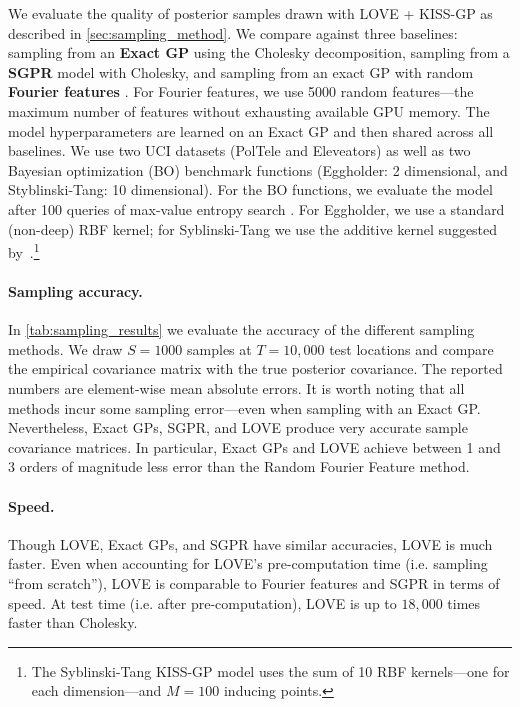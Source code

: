 We evaluate the quality of posterior samples drawn with LOVE + KISS-GP{} as described in \cref{sec:sampling_method}.
We compare against three baselines: sampling from an {\bf Exact GP} using the Cholesky decomposition, sampling from a {\bf SGPR} model with Cholesky, and sampling from an exact GP with random {\bf Fourier features} \citep{rahimi2008random}.
For Fourier features, we use 5000 random features---the maximum number of features without exhausting available GPU memory.
The model hyperparameters are learned on an Exact GP and then shared across all baselines.
We use two UCI datasets (PolTele and Eleveators) as well as two Bayesian optimization (BO) benchmark functions (Eggholder: 2 dimensional, and Styblinski-Tang: 10 dimensional).
For the BO functions, we evaluate the model after 100 queries of max-value entropy search \cite{wang2017max}.
For Eggholder, we use a standard (non-deep) RBF kernel;  for Syblinski-Tang we use the additive kernel suggested by~\citet{kandasamy2015high}.\footnote{
  The Syblinski-Tang KISS-GP model uses the sum of 10 RBF kernels---one for each dimension---and $M=100$ inducing points.
}

\paragraph{Sampling accuracy.}
In \cref{tab:sampling_results} we evaluate the accuracy of the different sampling methods.
We draw $S\!=\!1000$ samples at $T\!=\!10,\!000$ test locations and compare the empirical covariance matrix with the true posterior covariance.
The reported numbers are element-wise mean absolute errors.
It is worth noting that all methods incur some sampling error---even when sampling with an Exact GP.
Nevertheless, Exact GPs, SGPR, and LOVE{} produce very accurate sample covariance matrices.
In particular, Exact GPs and LOVE{} achieve between 1 and 3 orders of magnitude less error than the Random Fourier Feature method.

\paragraph{Speed.}
Though LOVE{}, Exact GPs, and SGPR have similar accuracies, LOVE{} is much faster.
Even when accounting for LOVE's pre-computation time (i.e. sampling ``from scratch''), LOVE{} is comparable to Fourier features and SGPR in terms of speed.
At test time (i.e. after pre-computation), LOVE{} is up to $18,\!000$ times faster than Cholesky.

